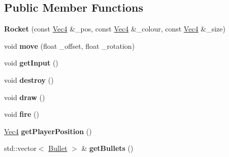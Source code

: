 \subsection*{Public Member Functions}
\begin{DoxyCompactItemize}
\item 
\hypertarget{classRocket_a938be03f178cfb0d0b16bb6d443a6754}{
{\bfseries Rocket} (const \hyperlink{classVec4}{Vec4} \&\_\-pos, const \hyperlink{classVec4}{Vec4} \&\_\-colour, const \hyperlink{classVec4}{Vec4} \&\_\-size)}
\label{classRocket_a938be03f178cfb0d0b16bb6d443a6754}

\item 
\hypertarget{classRocket_ab7219ebbda23a43593b5be4a3b3bee92}{
void {\bfseries move} (float \_\-offset, float \_\-rotation)}
\label{classRocket_ab7219ebbda23a43593b5be4a3b3bee92}

\item 
\hypertarget{classRocket_a73f7a6935f25ccd7cd01d33167c4a8df}{
void {\bfseries getInput} ()}
\label{classRocket_a73f7a6935f25ccd7cd01d33167c4a8df}

\item 
\hypertarget{classRocket_a75cd6640c1287c44212392669d1c7b1b}{
void {\bfseries destroy} ()}
\label{classRocket_a75cd6640c1287c44212392669d1c7b1b}

\item 
\hypertarget{classRocket_a6403ff21d81d9d68e108eeafe464b9b7}{
void {\bfseries draw} ()}
\label{classRocket_a6403ff21d81d9d68e108eeafe464b9b7}

\item 
\hypertarget{classRocket_ad234603acbb41c0a5870bfb1d8244da8}{
void {\bfseries fire} ()}
\label{classRocket_ad234603acbb41c0a5870bfb1d8244da8}

\item 
\hypertarget{classRocket_aa065576a420c8b86339c02e4bae7c183}{
\hyperlink{classVec4}{Vec4} {\bfseries getPlayerPosition} ()}
\label{classRocket_aa065576a420c8b86339c02e4bae7c183}

\item 
\hypertarget{classRocket_abc21b7644169920e56c9516162cc5607}{
std::vector$<$ \hyperlink{classBullet}{Bullet} $>$ \& {\bfseries getBullets} ()}
\label{classRocket_abc21b7644169920e56c9516162cc5607}

\end{DoxyCompactItemize}

